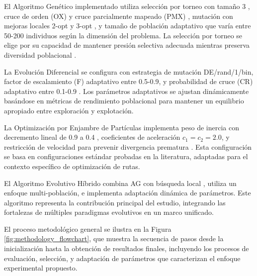 \documentclass[10pt,a4paper]{article}
\begin{document}
\begin{multicols}{2}
El Algoritmo Genético implementado utiliza selección por torneo con tamaño 3 \cite{blickle1996}, cruce de orden (OX) y cruce parcialmente mapeado (PMX) \cite{syswerda1989}, mutación con mejoras locales 2-opt y 3-opt \cite{reynolds2007}, y tamaño de población adaptativo que varía entre 50-200 individuos según la dimensión del problema. La selección por torneo se elige por su capacidad de mantener presión selectiva adecuada mientras preserva diversidad poblacional \cite{eiben2003}.

La Evolución Diferencial se configura con estrategia de mutación DE/rand/1/bin, factor de escalamiento (F) adaptativo entre 0.5-0.9, y probabilidad de cruce (CR) adaptativo entre 0.1-0.9 \cite{das2011}. Los parámetros adaptativos se ajustan dinámicamente basándose en métricas de rendimiento poblacional para mantener un equilibrio apropiado entre exploración y explotación.

La Optimización por Enjambre de Partículas implementa peso de inercia con decremento lineal de 0.9 a 0.4 \cite{clerc2002}, coeficientes de aceleración $c_1=c_2=2.0$, y restricción de velocidad para prevenir divergencia prematura \cite{pedersen2010}. Esta configuración se basa en configuraciones estándar probadas en la literatura, adaptadas para el contexto específico de optimización de rutas.

El Algoritmo Evolutivo Híbrido combina AG con búsqueda local \cite{voudouris2003}, utiliza un enfoque multi-población, e implementa adaptación dinámica de parámetros. Este algoritmo representa la contribución principal del estudio, integrando las fortalezas de múltiples paradigmas evolutivos en un marco unificado.

El proceso metodológico general se ilustra en la Figura \ref{fig:methodology_flowchart}, que muestra la secuencia de pasos desde la inicialización hasta la obtención de resultados finales, incluyendo los procesos de evaluación, selección, y adaptación de parámetros que caracterizan el enfoque experimental propuesto.
\end{multicols}
\end{document}
